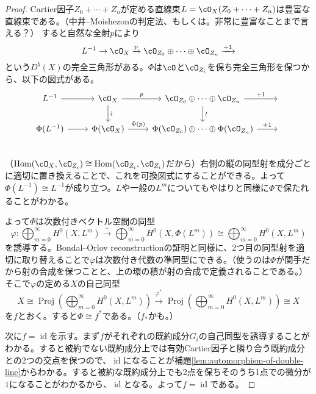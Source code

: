 \documentclass[uplatex, a4paper, dvipdfmx]{jsarticle}
\theoremstyle{definition}
\DeclareMathOperator{\Hom}{\mathrm{Hom}}
\DeclareMathOperator{\id}{\mathrm{id}}
\DeclareMathOperator{\Proj}{\mathrm{Proj}}
\begin{document}
\begin{proof}
    Cartier因子$Z_0 + \cdots + Z_n$が定める直線束$L = \cO_X(Z_0 + \cdots + Z_n)$は豊富な直線束である。（中井--Moishezonの判定法、もしくは\cite[Proposition 1.2.16]{MR2095471}。非常に豊富なことまで言える？）
    すると自然な全射$p$により
    \begin{equation}\label{eq:exact-triangle-of-very-ample-line-bundle}
        L^{-1} \to \cO_X \xrightarrow{p} \cO_{Z_0} \oplus \cdots \oplus \cO_{Z_n}\xrightarrow{+1}
    \end{equation}
    という$D^b(X)$の完全三角形がある。$\Phi$は$\cO$と$\cO_{Z_i}$を保ち完全三角形を保つから、以下の図式がある。
    \[
        \begin{tikzcd}
            L^{-1} \ar[r] & \cO_X \ar[r, "p"] \ar[d, "\sim", sloped] & \cO_{Z_0} \oplus \cdots \oplus \cO_{Z_n} \ar[r, "+1"]\ar[d, "\sim", sloped] &{}\\
            \Phi(L^{-1}) \ar[r] & \Phi(\cO_X) \ar[r, "\Phi(p)"] & \Phi(\cO_{Z_0}) \oplus \cdots \oplus \Phi(\cO_{Z_n}) \ar[r, "+1"] &{}\\
        \end{tikzcd}
    \]
    （$\Hom(\cO_X, \cO_{Z_i}) \cong \Hom(\cO_{Z_i}, \cO_{Z_i})$だから）右側の縦の同型射を成分ごとに適切に置き換えることで、これを可換図式にすることができる。よって$\Phi(L^{-1}) \cong L^{-1}$が成り立つ。$L$や一般の$L^m$についてもやはり\cite{MR3182005}と同様に$\Phi$で保たれることがわかる。

    よって$\Phi$は次数付きベクトル空間の同型
    \begin{equation}
        \varphi \colon \bigoplus_{m = 0}^\infty H^0(X, L^m) \xrightarrow{\sim} \bigoplus_{m = 0}^\infty H^0(X, \Phi(L^m)) \cong \bigoplus_{m = 0}^\infty H^0(X, L^m)
    \end{equation}
    を誘導する。Bondal--Orlov reconstructionの証明\cite{MR1818984}と同様に、2つ目の同型射を適切に取り替えることで$\varphi$は次数付き代数の準同型にできる。（使うのは$\Phi$が関手だから射の合成を保つことと、上の環の積が射の合成で定義されることである。）そこで$\varphi$の定める$X$の自己同型
    \begin{equation}
        X \cong \Proj(\bigoplus_{m = 0}^\infty H^0(X, L^m)) \xrightarrow{\varphi^*} \Proj(\bigoplus_{m = 0}^\infty H^0(X, L^m)) \cong X
    \end{equation}
    を$f$とおく。すると$\Phi \cong f^*$である。（$f_*$かも。）

    次に$f = \id$を示す。まず$f$がそれぞれの既約成分$G_i$の自己同型を誘導することがわかる。すると被約でない既約成分上では有効Cartier因子と隣り合う既約成分との2つの交点を保つので、$\id$になることが補題\ref{lem:automorphism-of-double-line}からわかる。すると被約な既約成分上でも2点を保ちそのうち1点での微分が$1$になることがわかるから、$\id$となる。よって$f = \id$である。
\end{proof}
\end{document}

